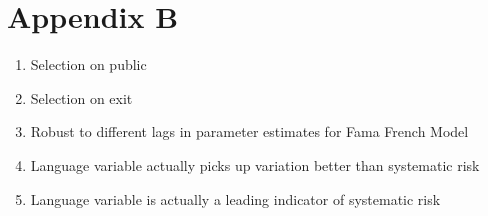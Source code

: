 \chapter{Appendix B\label{apndxB}}

\begin{enumerate}
  \item Selection on public
  \item Selection on exit
  \item Robust to different lags in parameter estimates for Fama French Model
  \item Language variable actually picks up variation better than systematic risk
  \item Language variable is actually a leading indicator of systematic risk
\end{enumerate}

